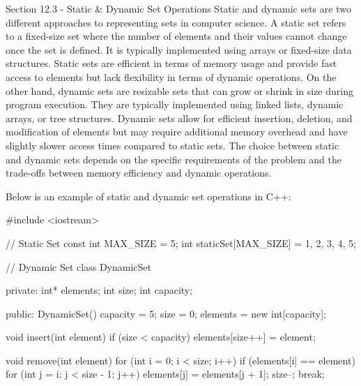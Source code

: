 \begin{notes}{Section 12.3 - Static \& Dynamic Set Operations}
    Static and dynamic sets are two different approaches to representing sets in computer science. A static set refers to a fixed-size set where the number of elements and their values cannot change once the set is defined. It is typically implemented using arrays or fixed-size data structures. Static sets are efficient in terms of memory usage and provide fast access to 
    elements but lack flexibility in terms of dynamic operations. On the other hand, dynamic sets are resizable sets that can grow or shrink in size during program execution. They are typically implemented using linked lists, dynamic arrays, or tree structures. Dynamic sets allow for efficient insertion, deletion, and modification of elements but may require additional 
    memory overhead and have slightly slower access times compared to static sets. The choice between static and dynamic sets depends on the specific requirements of the problem and the trade-offs between memory efficiency and dynamic operations.
    
    \begin{highlight}
        Below is an example of static and dynamic set operations in C++:
    
        \begin{code}[C++]
        #include <iostream>
    
        // Static Set
        const int MAX_SIZE = 5;
        int staticSet[MAX_SIZE] = {1, 2, 3, 4, 5};
        
        // Dynamic Set
        class DynamicSet {
        private:
            int* elements;
            int size;
            int capacity;
        
        public:
            DynamicSet() {
                capacity = 5;
                size = 0;
                elements = new int[capacity];
            }
        
            void insert(int element) {
                if (size < capacity) {
                    elements[size++] = element;
                }
            }
        
            void remove(int element) {
                for (int i = 0; i < size; i++) {
                    if (elements[i] == element) {
                        for (int j = i; j < size - 1; j++) {
                            elements[j] = elements[j + 1];
                        }
                        size--;
                        break;
                    }
                }
            }
        
}
\end{code}
\end{highlight}
\end{notes}
